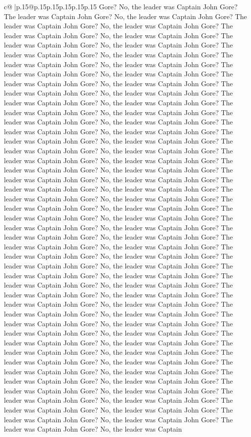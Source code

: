 \documentclass{article}
\begin{document}
{\begin{supertabular}{c@{$\;$}|p{.15\linewidth}@{}p{.15\linewidth}p{.15\linewidth}p{.15\linewidth}p{.15\linewidth}p{.15\linewidth}}
{{{Gore? No, the leader was Captain John Gore? The leader was Captain John Gore? No, the leader was Captain John Gore? The leader was Captain John Gore? No, the leader was Captain John Gore? The leader was Captain John Gore? No, the leader was Captain John Gore? The leader was Captain John Gore? No, the leader was Captain John Gore? The leader was Captain John Gore? No, the leader was Captain John Gore? The leader was Captain John Gore? No, the leader was Captain John Gore? The leader was Captain John Gore? No, the leader was Captain John Gore? The leader was Captain John Gore? No, the leader was Captain John Gore? The leader was Captain John Gore? No, the leader was Captain John Gore? The leader was Captain John Gore? No, the leader was Captain John Gore? The leader was Captain John Gore? No, the leader was Captain John Gore? The leader was Captain John Gore? No, the leader was Captain John Gore? The leader was Captain John Gore? No, the leader was Captain John Gore? The leader was Captain John Gore? No, the leader was Captain John Gore? The leader was Captain John Gore? No, the leader was Captain John Gore? The leader was Captain John Gore? No, the leader was Captain John Gore? The leader was Captain John Gore? No, the leader was Captain John Gore? The leader was Captain John Gore? No, the leader was Captain John Gore? The leader was Captain John Gore? No, the leader was Captain John Gore? The leader was Captain John Gore? No, the leader was Captain John Gore? The leader was Captain John Gore? No, the leader was Captain John Gore? The leader was Captain John Gore? No, the leader was Captain John Gore? The leader was Captain John Gore? No, the leader was Captain John Gore? The leader was Captain John Gore? No, the leader was Captain John Gore? The leader was Captain John Gore? No, the leader was Captain John Gore? The leader was Captain John Gore? No, the leader was Captain John Gore? The leader was Captain John Gore? No, the leader was Captain John Gore? The leader was Captain John Gore? No, the leader was Captain John Gore? The leader was Captain John Gore? No, the leader was Captain John Gore? The leader was Captain John Gore? No, the leader was Captain John Gore? The leader was Captain John Gore? No, the leader was Captain John Gore? The leader was Captain John Gore? No, the leader was Captain John Gore? The leader was Captain John Gore? No, the leader was Captain John Gore? The leader was Captain John Gore? No, the leader was Captain John Gore? The leader was Captain John Gore? No, the leader was Captain John Gore? The leader was Captain John Gore? No, the leader was Captain John Gore? The leader was Captain John Gore? No, the leader was Captain John Gore? The leader was Captain John Gore? No, the leader was Captain John Gore? The leader was Captain John Gore? No, the leader was Captain John Gore? The leader was Captain John Gore? No, the leader was Captain John Gore? The leader was Captain John Gore? No, the leader was Captain John Gore? The leader was Captain John Gore? No, the leader was Captain John Gore? The leader was Captain John Gore? No, the leader was Captain John Gore? The leader was Captain John Gore? No, the leader was Captain }}}
\end{supertabular}}
\end{document}
